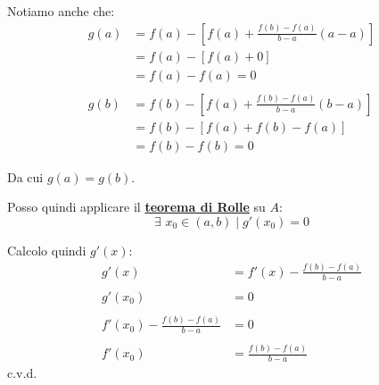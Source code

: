 \documentclass[../dimostrazioni]{subfiles}
\begin{document}
            Notiamo anche che:
            \begin{align*}
                g(a) &= f(a) - \left[f(a) + \frac{f(b) - f(a)}{b - a}(a - a) \right]\\
                     &= f(a) - \left[f(a) + 0 \right]\\
                     &= f(a) - f(a) = 0\\
                     \\
                g(b) &= f(b) - \left[f(a) + \frac{f(b) - f(a)}{b - a}(b - a) \right]\\
                     &= f(b) - \left[f(a) + f(b) - f(a) \right]\\
                     &= f(b) - f(b) = 0
            \end{align*}
            
            Da cui \( g(a) = g(b) \).

            Posso quindi applicare il \textbf{\hyperref[teoRolle]{teorema di Rolle}} su \( A \):
            \[
                \exists \, \, x_0 \in (a,b) \; | \; g'(x_0) = 0
            \]
            
            Calcolo quindi \( g'(x) \):
            \begin{align*}
                g'(x) &= f'(x) - \frac{f(b) - f(a)}{b-a}\\
                \\
                g'(x_0) &= 0 \\
                \\
                f'(x_0) - \frac{f(b) - f(a)}{b-a} &= 0\\
                \\
                f'(x_0) &= \frac{f(b) - f(a)}{b-a}
            \end{align*} c.v.d.
            
    
\end{document}
